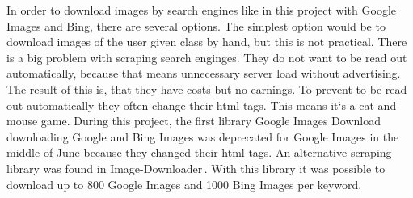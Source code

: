 \documentclass[../ImageClassifier.tex]{subfiles}
\begin{document}
    In order to download images by search engines like in this project with Google Images and Bing, there are several options.
    The simplest option would be to download images of the user given class by hand, but this is not practical.
    There is a big problem with scraping search enginges.
    They do not want to be read out automatically, because that means unnecessary server load without advertising.
    The result of this is, that they have costs but no earnings.
    To prevent to be read out automatically they often change their \ac{html} tags.
    This means it`s a cat and mouse game.
    During this project, the first library \flqq Google Images Download\flqq\,\parencite{google-image-download} downloading Google and Bing Images was deprecated for Google Images in the middle of June because they changed their \ac{html} tags.
    An alternative scraping library was found in \flqq Image-Downloader\flqq\,\parencite{image-downloader}.
    With this library it was possible to download up to 800 Google Images and 1000 Bing Images per keyword.
\end{document}

